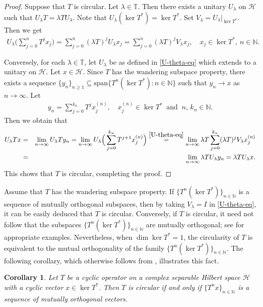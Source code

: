 \documentclass[a4paper,oneside,10pt, reqno]{amsproc}
\newtheorem{corollary}[theorem]{Corollary}%
\theoremstyle{remark}
\theoremstyle{definition}
\newcommand{\beqn}{\begin{eqnarray*}}
\newcommand{\eeqn}{\end{eqnarray*}}
\newcommand{\rar}{\rightarrow}
\begin{document}
\begin{proof}
Suppose that $T$ is circular. Let $\lambda \in \mathbb T$. Then there exists a unitary $U_\lambda$ on $\mathcal H$ such that $U_\lambda T = \lambda T U_\lambda$. Note that $U_\lambda(\ker T^*) = \ker T^*$. Set $V_\lambda = U_\lambda|_{\ker T^*}$. Then we get
\beqn
U_\lambda \Big(\sum_{j=0}^n T^j x_j \Big) = \sum_{j=0}^n (\lambda T)^j U_\lambda x_j = \sum_{j=0}^n (\lambda T)^j V_\lambda x_j, \quad x_j \in \ker T^*, \ n \in \mathbb N.
\eeqn

Conversely, for each $\lambda \in \mathbb T$, let $U_\lambda$ be as defined in \eqref{U-theta-eq} which extends to a unitary on $\mathcal H$. Let $x \in \mathcal H$. Since $T$ has the wandering subspace property, there exists a sequence $\{y_n\}_{n \geqslant 1} \subseteq \mathrm{span}\{T^n(\ker T^*) : n \in \mathbb N\}$ such that $y_n \rar x$ as $n \rar \infty$. Let 
\beqn
y_n = \sum_{j=0}^{k_n} T^j x^{(n)}_j, \quad x_j^{(n)} \in \ker T^* \ \text{ and }\ n,\, k_n \in \mathbb N. 
\eeqn
Then we obtain that
\beqn
U_\lambda T x &=& \lim_{n \rar \infty} U_\lambda T y_n = \lim_{n \rar \infty} U_\lambda \Big(\sum_{j=0}^{k_n} T^{j+1} x^{(n)}_j\Big) \overset{\eqref{U-theta-eq}}= \lim_{n \rar \infty} \lambda T \sum_{j=0}^{k_n} (\lambda T)^j V_\lambda x^{(n)}_j \\
&=& \lim_{n \rar \infty} \lambda T U_\lambda y_n = \lambda T U_\lambda x. 
\eeqn
This shows that $T$ is circular, completing the proof.
\end{proof}

Assume that $T$ has the wandering subspace property. If $\{T^n(\ker T^*)\}_{n \in \mathbb N}$ is a sequence of mutually orthogonal subspaces, then by taking $V_\lambda = I$ in \eqref{U-theta-eq}, it can be easily deduced that $T$ is circular. Conversely, if $T$ is circular, it need not follow that the subspaces $\{T^n(\ker T^*)\}_{n \in \mathbb N}$ are mutually orthogonal; see \cite{CT} for appropriate examples. Nevertheless, when $\dim\ker T^*=1$, the circularity of $T$ is equivalent to the mutual orthogonality of the family $\{T^n(\ker T^*)\}_{n \in \mathbb N}$. The following corollary, which otherwise follows from \cite[Theorem 2.5]{CY}, illustrates this fact. 

\begin{corollary}\label{cyclic-circular}
Let $T$ be a cyclic operator on a complex separable Hilbert space $\mathcal H$ with a cyclic vector $x \in \ker T^*$. Then $T$ is circular if and only if $\{T^n x\}_{n \in \mathbb N}$ is a sequence of mutually orthogonal vectors.
\end{corollary}
\end{document}
